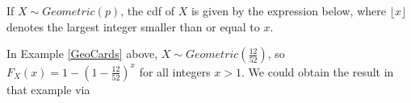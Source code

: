 \begin{prop}
If $X \sim Geometric(p)$, the cdf of $X$ is given by the expression below, where $\lfloor x \rfloor$ denotes the largest integer smaller than or equal to $x$.
\renewcommand*{\arraystretch}{1.35}
\renewcommand*{\arraystretch}{1}
\end{prop}


\par In Example \ref{GeoCards} above, $X \sim Geometric(\frac{12}{52})$, so $F_X(x) = 1 - (1-\frac{12}{52})^{x}$ for all integers $x > 1$. We could obtain the result in that example via

